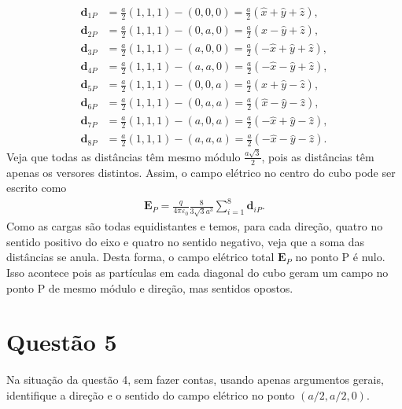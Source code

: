 \documentclass[11pt]{article}
\begin{document}
\begin{align*}
  \mathbf{d}_{1P} &= \frac a2(1,1,1) - (0,0,0)
                    = \frac a2(\hat x+\hat y+\hat z),\\
  \mathbf{d}_{2P} &= \frac a2(1,1,1) - (0,a,0)
                    = \frac a2(\hat x-\hat y+\hat z),\\
  \mathbf{d}_{3P} &= \frac a2(1,1,1) - (a,0,0)
                    = \frac a2(-\hat x+\hat y+\hat z),\\
  \mathbf{d}_{4P} &= \frac a2(1,1,1) - (a,a,0)
                    = \frac a2(-\hat x-\hat y+\hat z),\\
  \mathbf{d}_{5P} &= \frac a2(1,1,1) - (0,0,a)
                    = \frac a2(\hat x+\hat y-\hat z),\\
  \mathbf{d}_{6P} &= \frac a2(1,1,1) - (0,a,a)
                    = \frac a2(\hat x-\hat y-\hat z),\\
  \mathbf{d}_{7P} &= \frac a2(1,1,1) - (a,0,a)
                    = \frac a2(-\hat x+\hat y-\hat z),\\
  \mathbf{d}_{8P} &= \frac a2(1,1,1) - (a,a,a)
                    = \frac a2(-\hat x-\hat y-\hat z).
\end{align*}
Veja que todas as distâncias têm mesmo módulo \(\frac{a\sqrt3}2\), pois as
distâncias têm apenas os versores distintos. Assim, o campo elétrico no
centro do cubo pode ser escrito como
\begin{align*}
  \mathbf{E}_P = \frac{q}{4\pi\varepsilon_0} \frac{8}{3\sqrt3a^3}\sum_{i=1}^8 \mathbf{d}_{iP}.
\end{align*}
Como as cargas são todas equidistantes e temos, para cada
direção, quatro no sentido positivo do eixo e quatro no sentido
negativo, veja que a soma das distâncias se anula. Desta forma, o campo
elétrico total \(\mathbf E_P\) no ponto P é nulo. Isso acontece pois as
partículas em cada diagonal do cubo geram um campo no ponto P de mesmo
módulo e direção, mas sentidos opostos.

\section{Questão 5}
\label{sec:org71d6785}
Na situação da questão 4, sem fazer contas, usando apenas argumentos
gerais, identifique a direção e o sentido do campo elétrico no ponto
\((a/2,a/2,0)\). 
\end{document}
